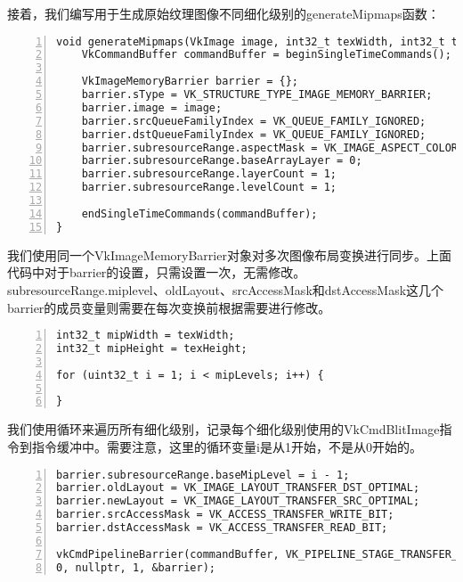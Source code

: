 \documentclass{ctexart}
\begin{document}
接着，我们编写用于生成原始纹理图像不同细化级别的generateMipmaps函数：

\begin{lstlisting}[language={[ANSI]C},keywordstyle=\color{blue!70},commentstyle=\color{red!50!green!50!blue!50},frame=shadowbox, rulesepcolor=\color{red!20!green!20!blue!20},basicstyle=\small,numbers=left, numberstyle=\tiny,breaklines=true]
void generateMipmaps(VkImage image, int32_t texWidth, int32_t texHeight, uint32_t mipLevels) {
	VkCommandBuffer commandBuffer = beginSingleTimeCommands();

	VkImageMemoryBarrier barrier = {};
	barrier.sType = VK_STRUCTURE_TYPE_IMAGE_MEMORY_BARRIER;
	barrier.image = image;
	barrier.srcQueueFamilyIndex = VK_QUEUE_FAMILY_IGNORED;
	barrier.dstQueueFamilyIndex = VK_QUEUE_FAMILY_IGNORED;
	barrier.subresourceRange.aspectMask = VK_IMAGE_ASPECT_COLOR_BIT;
	barrier.subresourceRange.baseArrayLayer = 0;
	barrier.subresourceRange.layerCount = 1;
	barrier.subresourceRange.levelCount = 1;

	endSingleTimeCommands(commandBuffer);
}
\end{lstlisting}

我们使用同一个VkImageMemoryBarrier对象对多次图像布局变换进行同步。上面代码中对于barrier的设置，只需设置一次，无需修改。subresourceRange.miplevel、oldLayout、srcAccessMask和dstAccessMask这几个barrier的成员变量则需要在每次变换前根据需要进行修改。

\begin{lstlisting}[language={[ANSI]C},keywordstyle=\color{blue!70},commentstyle=\color{red!50!green!50!blue!50},frame=shadowbox, rulesepcolor=\color{red!20!green!20!blue!20},basicstyle=\small,numbers=left, numberstyle=\tiny,breaklines=true]
int32_t mipWidth = texWidth;
int32_t mipHeight = texHeight;

for (uint32_t i = 1; i < mipLevels; i++) {

}
\end{lstlisting}

我们使用循环来遍历所有细化级别，记录每个细化级别使用的VkCmdBlitImage指令到指令缓冲中。需要注意，这里的循环变量i是从1开始，不是从0开始的。

\begin{lstlisting}[language={[ANSI]C},keywordstyle=\color{blue!70},commentstyle=\color{red!50!green!50!blue!50},frame=shadowbox, rulesepcolor=\color{red!20!green!20!blue!20},basicstyle=\small,numbers=left, numberstyle=\tiny,breaklines=true]
barrier.subresourceRange.baseMipLevel = i - 1;
barrier.oldLayout = VK_IMAGE_LAYOUT_TRANSFER_DST_OPTIMAL;
barrier.newLayout = VK_IMAGE_LAYOUT_TRANSFER_SRC_OPTIMAL;
barrier.srcAccessMask = VK_ACCESS_TRANSFER_WRITE_BIT;
barrier.dstAccessMask = VK_ACCESS_TRANSFER_READ_BIT;

vkCmdPipelineBarrier(commandBuffer, VK_PIPELINE_STAGE_TRANSFER_BIT, VK_PIPELINE_STAGE_TRANSFER_BIT, 0, 0, nullptr,
0, nullptr, 1, &barrier);
\end{lstlisting}
\end{document}
